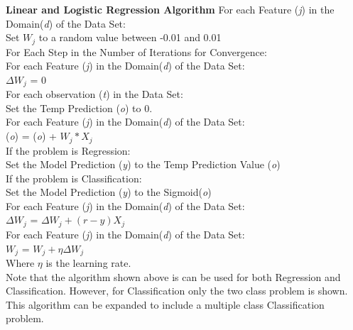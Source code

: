 \documentclass[twoside,11pt]{article}
\newcommand\tab[1][1cm]{\hspace*{#1}}
\begin{document}
\textbf{Linear and Logistic Regression Algorithm}\newline
For each Feature (\textit{j}) in the Domain(\textit{d}) of the Data Set:\\
\tab Set $W_j$ to a random value between -0.01 and 0.01\\
For Each Step in the Number of Iterations for Convergence:\\
\tab For each Feature (\textit{j}) in the Domain(\textit{d}) of the Data Set:\\
\tab \tab $\Delta W_j$ = 0\\
\tab For each observation (\textit{t}) in the Data Set:\\
\tab \tab Set the Temp Prediction (\textit{o}) to 0.\\
\tab \tab \tab For each Feature (\textit{j}) in the Domain(\textit{d}) of the Data Set:\\
\tab \tab \tab \tab  (\textit{o}) =  (\textit{o}) + $W_j * X_j$\\
\tab \tab \tab If the problem is Regression:\\
\tab \tab \tab \tab Set the Model Prediction (\textit{y}) to the Temp Prediction Value (\textit{o})\\
\tab \tab \tab If the problem is Classification:\\
\tab \tab \tab \tab Set the Model Prediction (\textit{y}) to the Sigmoid(\textit{o})\\
\tab \tab \tab For each Feature (\textit{j}) in the Domain(\textit{d}) of the Data Set:\\
\tab \tab \tab \tab $\Delta W_j$ = $\Delta W_j + (r - y)X_j$\\
\tab For each Feature (\textit{j}) in the Domain(\textit{d}) of the Data Set:\\
\tab \tab $W_j$ = $W_j + \eta \Delta W_j $\\

Where $\eta$ is the learning rate.\\
Note that the algorithm shown above is can be used for both Regression and Classification. However, for Classification only the two class problem is shown. This algorithm can be expanded to include a multiple class Classification problem.\newline  
\end{document}
